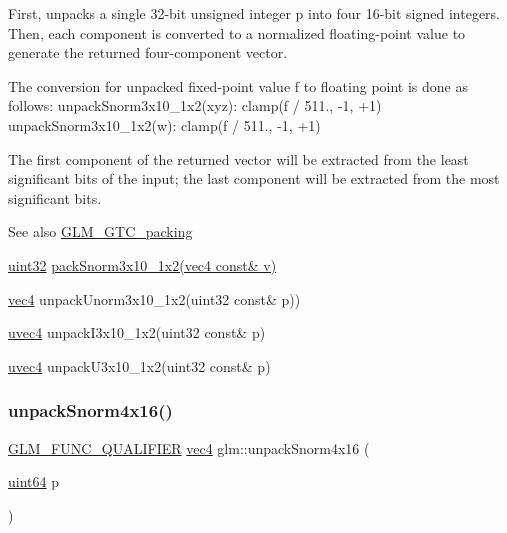 First, unpacks a single 32-\/bit unsigned integer p into four 16-\/bit signed integers. Then, each component is converted to a normalized floating-\/point value to generate the returned four-\/component vector.

The conversion for unpacked fixed-\/point value f to floating point is done as follows\+: unpack\+Snorm3x10\+\_\+1x2(xyz)\+: clamp(f / 511., -\/1, +1) unpack\+Snorm3x10\+\_\+1x2(w)\+: clamp(f / 511., -\/1, +1)

The first component of the returned vector will be extracted from the least significant bits of the input; the last component will be extracted from the most significant bits.

\begin{DoxySeeAlso}{See also}
\hyperlink{group__gtc__packing}{G\+L\+M\+\_\+\+G\+T\+C\+\_\+packing} 

\hyperlink{group__gtc__type__precision_ga202b6a53c105fcb7e531f9b443518451}{uint32} \hyperlink{group__gtc__packing_ga0d4157cec37c0312216a7be1cc92df54}{pack\+Snorm3x10\+\_\+1x2(vec4 const\& v)} 

\hyperlink{group__core__types_ga5881b1b022d7fd1b7218f5916532dd02}{vec4} unpack\+Unorm3x10\+\_\+1x2(uint32 const\& p)) 

\hyperlink{group__core__types_ga1c426d19627b32b14f0089f7f4ba7b1d}{uvec4} unpack\+I3x10\+\_\+1x2(uint32 const\& p) 

\hyperlink{group__core__types_ga1c426d19627b32b14f0089f7f4ba7b1d}{uvec4} unpack\+U3x10\+\_\+1x2(uint32 const\& p) 
\end{DoxySeeAlso}
\mbox{\label{group__gtc__packing_ga1bfaa3f217fd7a4b6b9d3117ecb3fcac}} 
\subsubsection{\texorpdfstring{unpack\+Snorm4x16()}{unpackSnorm4x16()}}
{\footnotesize\ttfamily \hyperlink{setup_8hpp_a33fdea6f91c5f834105f7415e2a64407}{G\+L\+M\+\_\+\+F\+U\+N\+C\+\_\+\+Q\+U\+A\+L\+I\+F\+I\+ER} \hyperlink{group__core__types_ga5881b1b022d7fd1b7218f5916532dd02}{vec4} glm\+::unpack\+Snorm4x16 (\begin{DoxyParamCaption}\item[{\hyperlink{group__gtc__type__precision_gae3632bf9b37da66233d78930dd06378a}{uint64}}]{p }\end{DoxyParamCaption})}

